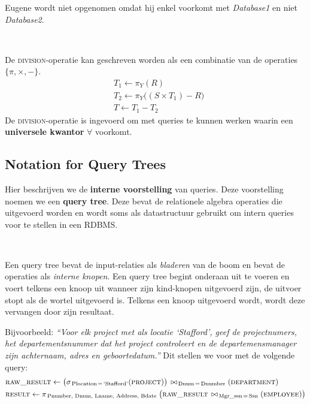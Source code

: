 Eugene wordt niet opgenomen omdat hij enkel voorkomt met \textit{Database1} en niet \textit{Database2}.

~

\noindent De \textsc{division}-operatie kan geschreven worden als een combinatie van de operaties $\{\pi,\times,-\}$.
\vspace{-2mm}
\begin{align*}
& T_1 \leftarrow \pi_Y (R) \\
& T_2 \leftarrow \pi_Y \big((S \times T_1) - R\big) \\
& T \leftarrow T_1 - T_2
\end{align*}
De \textsc{division}-operatie is ingevoerd om met queries te kunnen werken waarin een \textbf{universele kwantor} $\forall$ voorkomt.


\subsection{Notation for Query Trees}
Hier beschrijven we de \textbf{interne voorstelling} van queries. Deze voorstelling noemen we een \textbf{query tree}. Deze bevat de relationele algebra operaties die uitgevoerd worden en wordt soms als datastructuur gebruikt om intern queries voor te stellen in  een RDBMS.

~

\noindent Een query tree bevat de input-relaties als \textit{bladeren} van de boom en bevat de operaties als \textit{interne knopen}. Een query tree begint onderaan uit te voeren en voert telkens een knoop uit wanneer zijn kind-knopen uitgevoerd zijn, de uitvoer stopt als de wortel uitgevoerd is. Telkens een knoop uitgevoerd wordt, wordt deze vervangen door zijn resultaat.

Bijvoorbeeld: \textit{``Voor elk project met als locatie `Stafford', geef de projectnumers, het departementsnummer dat het project controleert en de departemensmanager zijn achternaam, adres en geboortedatum.''} Dit stellen we voor met de volgende query:
\vspace{-2mm}
\begin{align*}
& \textsc{raw\_result} \leftarrow \big( \sigma_{\,\text{Plocation} \,=\, \text{`Stafford'}}(\textsc{project}) \big) \,\bowtie_{\,\text{Dnum} \,=\, \text{Dnumber}} (\textsc{department}) \\
& \textsc{result} \leftarrow \pi_{\,\text{Pnumber, Dnum, Lname, Address, Bdate}} \; \big( \textsc{raw\_result} \,\bowtie_{\,\text{Mgr\_ssn} \,=\, \text{Ssn}} (\textsc{employee}) \big)
\end{align*}

